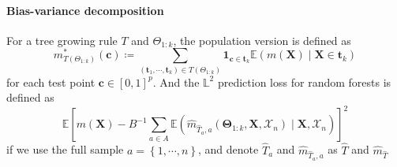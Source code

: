 \documentclass[twoside]{article}
\begin{document}
\paragraph*{Bias-variance decomposition}
For a tree growing rule $T$ and $\Theta_{1:k}$, the population version is defined as 
\begin{equation}
    m^*_{T(\Theta_{1:k})}(\mathbf{c}) \coloneq \sum_{\left(\mathbf{t}_1,\cdots,\mathbf{t}_k\right)\in T(\Theta_{1:k})} \mathbf{1}_{\mathbf{c}\in\mathbf{t}_k}\mathbb{E}\left(m(\mathbf{X})\mid \mathbf{X}\in \mathbf{t}_k\right)
\end{equation}
for each test point $\mathbf{c}\in [0,1]^p$. And the $\mathbb{L}^2$ prediction loss for random forests is defined as 
\begin{equation}
    \mathbb{E}\left[ m(\mathbf{X}) - B^{-1}\sum_{a\in A}\mathbb{E}\left( \hat{m}_{\hat{T}_a,a} \left(\boldsymbol{\Theta}_{1:k},\mathbf{X},\mathcal{X}_n\right)\mid \mathbf{X},\mathcal{X}_n \right) \right]^2
\end{equation}
if we use the full sample $a=\left\{1,\cdots,n\right\}$, and denote $\hat{T}_a$ and $\hat{m}_{\hat{T}_a,a}$ as $\hat{T}$ and $\hat{m}_{\hat{T}}$

\citet{chi2022asymptotic}

\newpage


\end{document}
